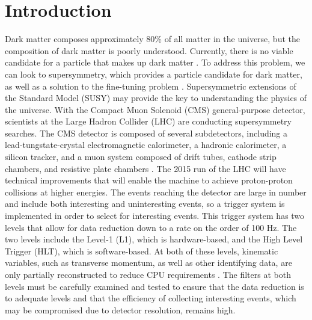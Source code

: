 \documentclass[twocolumn,aps,prd,reprint]{revtex4-1}
\begin{document}
\section{Introduction}
Dark matter composes approximately 80\% of all matter in the universe, but the composition of dark matter is poorly understood. Currently, there is no viable candidate for a particle that makes up dark matter \cite{dark}. To address this problem, we can look to supersymmetry, which provides a particle candidate for dark matter, as well as a solution to the fine-tuning problem \cite{primer}. Supersymmetric extensions of the Standard Model (SUSY) may provide the key to understanding the physics of the universe. With the Compact Muon Solenoid (CMS) general-purpose detector, scientists at the Large Hadron Collider (LHC) are conducting supersymmetry searches. The CMS detector is composed of several subdetectors, including a lead-tungstate-crystal electromagnetic calorimeter, a hadronic calorimeter, a silicon tracker, and a muon system composed of drift tubes, cathode strip chambers, and resistive plate chambers \cite{lhc_detectors}. 
The 2015 run of the LHC will have technical improvements that will enable the machine to achieve proton-proton collisions at higher energies. The events reaching the detector are large in number and include both interesting and uninteresting events, so a trigger system is implemented in order to select for interesting events. This trigger system has two levels that allow for data reduction down to a rate on the order of 100 Hz. The two levels include the Level-1 (L1), which is hardware-based, and the High Level Trigger (HLT), which is software-based. At both of these levels, kinematic variables, such as transverse momentum, as well as other identifying data, are only partially reconstructed to reduce CPU requirements \cite{hlt}. The filters at both levels must be carefully examined and tested to ensure that the data reduction is to adequate levels and that the efficiency of collecting interesting events, which may be compromised due to detector resolution, remains high. 
\end{document}
